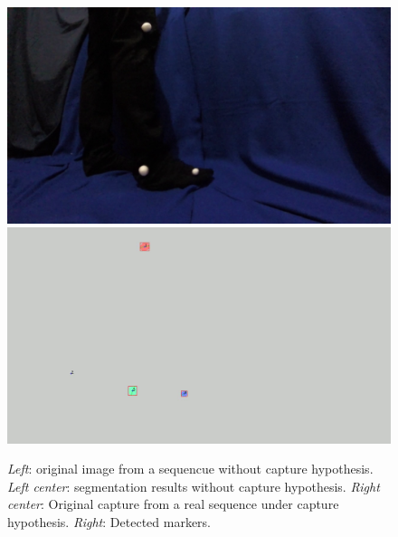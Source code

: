\begin{figure}[ht!]
        {\includegraphics[scale=0.07]{imagenes/orig.png}\label{abelvideo2}}\hspace{1 mm}
        {\includegraphics[scale=0.07]{imagenes/detect.png}
        \label{abeldetect}}
      \caption{%
       \textit{Left}: original image from a sequencue without capture hypothesis. 
       \textit{Left center}: segmentation results without capture hypothesis.
       \textit{Right center}: Original capture from a real sequence under capture hypothesis.
       \textit{Right}: Detected markers.}  
      \label{ejemploabelumbr2}
\end{figure}
